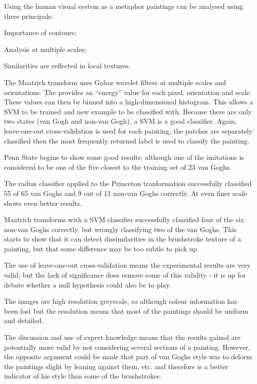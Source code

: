 \documentclass[conference]{IEEEtran}
\begin{document}
Using the human visual system as a metaphor paintings can be analysed using
three principals:
\begin{inparaenum}[1)]
\item Importance of contours;
\item Analysis at multiple scales;
\item Similarities are reflected in local textures.
\end{inparaenum}

The Maatrich transform uses Gabor wavelet filters at multiple scales and
orientations. The provides an ``energy'' value for each pixel, orientation and
scale. These values can then be binned into a high-dimensional histogram. This
allows a \gls{SVM} to be trained and new example to be classified
with. Because there are only two states (van Gogh and non-van Gogh), a
\gls{SVM} is a good classifier. Again, leave-one-out cross-validation is used
for each painting, the patches are separately classified then the most
frequently returned label is used to classify the painting.

Penn State begins to show some good results, although one of the imitations is
considered to be one of the five closest to the training set of 23 van Goghs.

The radius classifier applied to the Princeton tranformation successfully
classified 55 of 65 van Goghs and 9 out of 11 non-van Goghs correctly. At even
finer scale shows even better results.

Maatrich transforms with a \gls{SVM} classifier successfully classified four of
the six non-van Goghs correctly, but wrongly classifying two of the van Goghs.
This starts to show that it can detect dissimilarities in the brushstroke
texture of a painting, but that some difference may be too subtle to pick up.

The use of leave-one-out cross-validation means the experimental results are
very valid; but the lack of significance does remove some of this validity - it
is up for debate whether a null hypothesis could also be to play.

The images are high resolution greyscale, so although colour information has
been lost but the resolution means that most of the paintings should be uniform
and detailed.

The discussion and use of expert knowledge means that the results gained are
potentially more valid by not considering several sections of a painting.
However, the opposite argument could be made that part of van Goghs style was
to deform the paintings slight by leaning against them, etc. and therefore is a
better indicator of his style than some of the brushstrokes.
\end{document}
